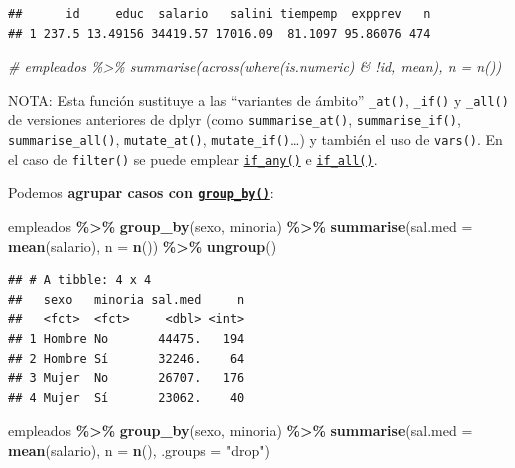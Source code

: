 \documentclass[
]{book}
\newenvironment{Shaded}{\begin{snugshade}}{\end{snugshade}}
\newcommand{\AttributeTok}[1]{\textcolor[rgb]{0.13,0.29,0.53}{#1}}
\newcommand{\CommentTok}[1]{\textcolor[rgb]{0.56,0.35,0.01}{\textit{#1}}}
\newcommand{\FunctionTok}[1]{\textcolor[rgb]{0.13,0.29,0.53}{\textbf{#1}}}
\newcommand{\NormalTok}[1]{#1}
\newcommand{\SpecialCharTok}[1]{\textcolor[rgb]{0.81,0.36,0.00}{\textbf{#1}}}
\newcommand{\StringTok}[1]{\textcolor[rgb]{0.31,0.60,0.02}{#1}}
\begin{document}
\begin{verbatim}
##      id     educ  salario   salini tiempemp  expprev   n
## 1 237.5 13.49156 34419.57 17016.09  81.1097 95.86076 474
\end{verbatim}

\begin{Shaded}
\begin{Highlighting}[]
\CommentTok{\# empleados \%\textgreater{}\% summarise(across(where(is.numeric) \& !id, mean), n = n())}
\end{Highlighting}
\end{Shaded}

NOTA: Esta función sustituye a las ``variantes de ámbito'' \texttt{\_at()}, \texttt{\_if()} y \texttt{\_all()} de versiones anteriores de dplyr (como \texttt{summarise\_at()}, \texttt{summarise\_if()}, \texttt{summarise\_all()}, \texttt{mutate\_at()}, \texttt{mutate\_if()}\ldots) y también el uso de \texttt{vars()}.
En el caso de \texttt{filter()} se puede emplear \href{https://dplyr.tidyverse.org/reference/across.html}{\texttt{if\_any()}} e \href{https://dplyr.tidyverse.org/reference/across.html}{\texttt{if\_all()}}.

Podemos \textbf{agrupar casos con \href{https://dplyr.tidyverse.org/reference/group_by.html}{\texttt{group\_by()}}}:

\begin{Shaded}
\begin{Highlighting}[]
\NormalTok{empleados }\SpecialCharTok{\%\textgreater{}\%} \FunctionTok{group\_by}\NormalTok{(sexo, minoria) }\SpecialCharTok{\%\textgreater{}\%} 
    \FunctionTok{summarise}\NormalTok{(}\AttributeTok{sal.med =} \FunctionTok{mean}\NormalTok{(salario), }\AttributeTok{n =} \FunctionTok{n}\NormalTok{()) }\SpecialCharTok{\%\textgreater{}\%}
    \FunctionTok{ungroup}\NormalTok{()}
\end{Highlighting}
\end{Shaded}

\begin{verbatim}
## # A tibble: 4 x 4
##   sexo   minoria sal.med     n
##   <fct>  <fct>     <dbl> <int>
## 1 Hombre No       44475.   194
## 2 Hombre Sí       32246.    64
## 3 Mujer  No       26707.   176
## 4 Mujer  Sí       23062.    40
\end{verbatim}

\begin{Shaded}
\begin{Highlighting}[]
\NormalTok{empleados }\SpecialCharTok{\%\textgreater{}\%} \FunctionTok{group\_by}\NormalTok{(sexo, minoria) }\SpecialCharTok{\%\textgreater{}\%} 
    \FunctionTok{summarise}\NormalTok{(}\AttributeTok{sal.med =} \FunctionTok{mean}\NormalTok{(salario), }\AttributeTok{n =} \FunctionTok{n}\NormalTok{(), }\AttributeTok{.groups =} \StringTok{"drop"}\NormalTok{)}
\end{Highlighting}
\end{Shaded}
\end{document}
